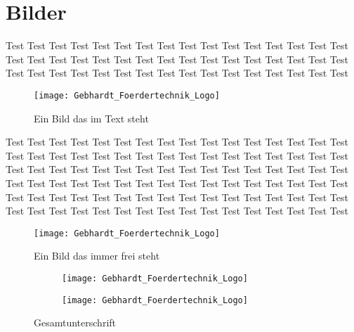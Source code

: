 \chapter{Bilder}

Test Test Test Test Test Test Test Test Test Test Test Test Test Test Test Test Test Test Test Test Test Test Test Test 
Test Test Test Test Test Test Test Test Test Test Test Test Test Test Test Test Test Test Test Test Test Test Test Test 

 \begin{wrapfigure}{r}{0.65\textwidth}
 \texttt{[image: Gebhardt\_Foerdertechnik\_Logo]}
 \caption{Ein Bild das im Text steht}
 \label{Abb:imText}
 \end{wrapfigure}
 
 Test Test Test Test Test Test Test Test Test Test Test Test Test Test Test Test Test Test Test Test Test Test Test Test 
Test Test Test Test Test Test Test Test Test Test Test Test Test Test Test Test Test Test Test Test Test Test Test Test 
Test Test Test Test Test Test Test Test Test Test Test Test Test Test Test Test Test Test Test Test Test Test Test Test 
Test Test Test Test Test Test Test Test Test Test Test Test Test Test Test Test Test Test Test Test Test Test Test Test 


 
  \begin{figure}[h]
 \texttt{[image: Gebhardt\_Foerdertechnik\_Logo]}
 \caption{Ein Bild das immer frei steht}
 \label{Abb:basic}
 \end{figure}
 
 
 \begin{figure}[h]
	\begin{subfigure}[c]{0.5\textwidth}
		\texttt{[image: Gebhardt\_Foerdertechnik\_Logo]}
		\label{Abb:sub1}
	\end{subfigure}
	\begin{subfigure}[c]{0.5\textwidth}
		\texttt{[image: Gebhardt\_Foerdertechnik\_Logo]}
		\label{Abb:sub2}
	\end{subfigure}
	\caption{Gesamtunterschrift}
	\label{Abb:gesamt}
\end{figure}